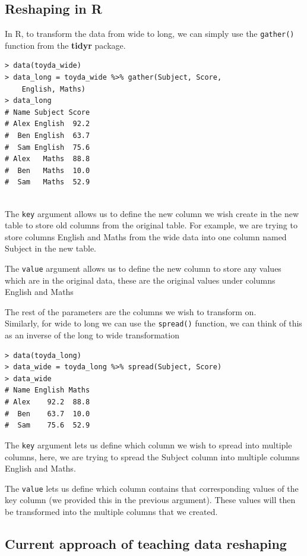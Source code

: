 \subsection{Reshaping in \textsf{R}}
In \textsf{R}, to transform the data from wide to long, we can simply use the \texttt{gather()} function from the \textbf{tidyr} package.
\begin{lstlisting}
> data(toyda_wide)
> data_long = toyda_wide %>% gather(Subject, Score, 
    English, Maths)
> data_long
# Name Subject Score
# Alex English  92.2
#  Ben English  63.7
#  Sam English  75.6
# Alex   Maths  88.8
#  Ben   Maths  10.0
#  Sam   Maths  52.9
\end{lstlisting} \\

The \texttt{key} argument allows us to define the new column we wish create in the new table to store old columns from the original table. For example, we are trying to store columns English and Maths from the wide data into one column named Subject in the new table.

The \texttt{value} argument allows us to define the new column to store any values which are in the original data, these are the original values under columns English and Maths

The rest of the parameters are the columns we wish to transform on. \\

Similarly, for wide to long we can use the \texttt{spread()} function, we can think of this as an inverse of the long to wide transformation
\begin{lstlisting}
> data(toyda_long)
> data_wide = toyda_long %>% spread(Subject, Score)
> data_wide
# Name English Maths
# Alex    92.2  88.8
#  Ben    63.7  10.0
#  Sam    75.6  52.9
\end{lstlisting}

The \texttt{key} argument lets us define which column we wish to spread into multiple columns, here, we are trying to spread the Subject column into multiple columns English and Maths.

The \texttt{value} lets us define which column contains that corresponding values of the key column (we provided this in the previous argument). These values will then be transformed into the multiple columns that we created. 

\subsection{Current approach of teaching data reshaping}

